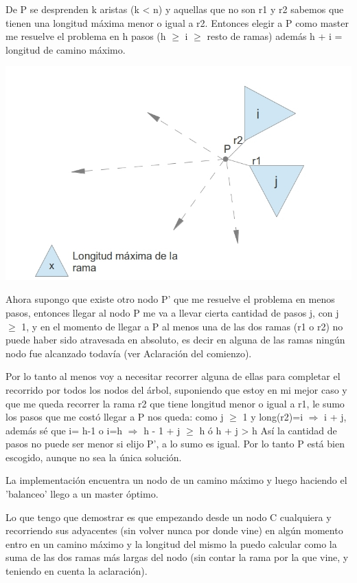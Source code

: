 De P se desprenden k aristas (k < n) y aquellas que no son r1 y r2 sabemos que tienen una longitud máxima menor o igual a r2. Entonces elegir a P como master me resuelve el problema en h pasos (h $\geq$ i $\geq$ resto de ramas) además h + i = longitud de camino máximo.
\begin{center}
\includegraphics[scale=0.4]{ej2/2/graficos/imagen03.jpg} 
\end{center}
Ahora supongo que existe otro nodo P' que me resuelve el problema en menos pasos, entonces llegar al nodo P me va a llevar cierta cantidad de pasos j, con j $\geq$ 1, y en el momento de llegar a P al menos una de las dos ramas (r1 o r2) no puede haber sido atravesada en absoluto, es decir en alguna de las ramas ningún nodo fue alcanzado todavía (ver Aclaración del comienzo). 

Por lo tanto al menos voy a necesitar recorrer alguna de ellas para completar el recorrido por todos los nodos del árbol, suponiendo que estoy en mi mejor caso y que me queda recorrer la rama r2 que tiene longitud menor o igual a r1, le sumo los pasos que me costó llegar a P nos queda: como j $\geq$ 1 y long(r2)=i $\Rightarrow$ i + j, además sé que i= h-1 o i=h $\Rightarrow$  h - 1 + j $\geq$ h ó h + j > h
Así la cantidad de pasos no puede ser menor si elijo P', a lo sumo es igual. Por lo tanto P está bien escogido, aunque no sea la única solución.


La implementación encuentra un nodo de un camino máximo y luego haciendo el 'balanceo' llego a un master óptimo.

Lo que tengo que demostrar es que empezando desde un nodo C cualquiera y recorriendo sus adyacentes (sin volver nunca por donde vine) en algún momento entro en un camino máximo y la longitud del mismo la puedo calcular como la suma de las dos ramas más largas del nodo (sin contar la rama por la que vine, y teniendo en cuenta la aclaración).

